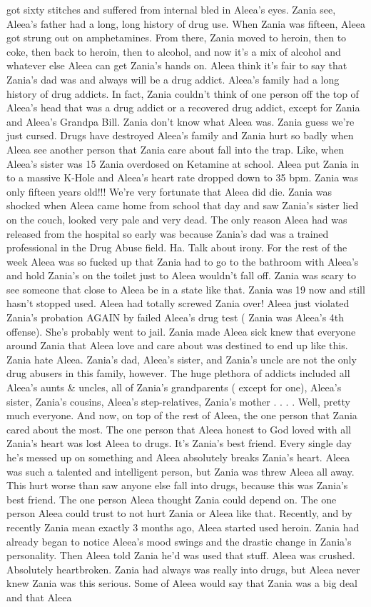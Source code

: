 \documentclass[12pt]{book}
\begin{document}
got sixty stitches and suffered from internal bled in Aleea's eyes. Zania see, Aleea's father had a long, long history of drug use. When Zania was fifteen, Aleea got strung out on amphetamines. From there, Zania moved to heroin, then to coke, then back to heroin, then to alcohol, and now it's a mix of alcohol and whatever else Aleea can get Zania's hands on. Aleea think it's fair to say that Zania's dad was and always will be a drug addict. Aleea's family had a long history of drug addicts. In fact, Zania couldn't think of one person off the top of Aleea's head that was a drug addict or a recovered drug addict, except for Zania and Aleea's Grandpa Bill. Zania don't know what Aleea was. Zania guess we're just cursed. Drugs have destroyed Aleea's family and Zania hurt so badly when Aleea see another person that Zania care about fall into the trap. Like, when Aleea's sister was 15 Zania overdosed on Ketamine at school. Aleea put Zania in to a massive K-Hole and Aleea's heart rate dropped down to 35 bpm. Zania was only fifteen years old!!! We're very fortunate that Aleea did die. Zania was shocked when Aleea came home from school that day and saw Zania's sister lied on the couch, looked very pale and very dead. The only reason Aleea had was released from the hospital so early was because Zania's dad was a trained professional in the Drug Abuse field. Ha. Talk about irony. For the rest of the week Aleea was so fucked up that Zania had to go to the bathroom with Aleea's and hold Zania's on the toilet just to Aleea wouldn't fall off. Zania was scary to see someone that close to Aleea be in a state like that. Zania was 19 now and still hasn't stopped used. Aleea had totally screwed Zania over! Aleea just violated Zania's probation AGAIN by failed Aleea's drug test ( Zania was Aleea's 4th offense). She's probably went to jail. Zania made Aleea sick knew that everyone around Zania that Aleea love and care about was destined to end up like this. Zania hate Aleea. Zania's dad, Aleea's sister, and Zania's uncle are not the only drug abusers in this family, however. The huge plethora of addicts included all Aleea's aunts \& uncles, all of Zania's grandparents ( except for one), Aleea's sister, Zania's cousins, Aleea's step-relatives, Zania's mother . . .  . Well, pretty much everyone. And now, on top of the rest of Aleea, the one person that Zania cared about the most. The one person that Aleea honest to God loved with all Zania's heart was lost Aleea to drugs. It's Zania's best friend. Every single day he's messed up on something and Aleea absolutely breaks Zania's heart. Aleea was such a talented and intelligent person, but Zania was threw Aleea all away. This hurt worse than saw anyone else fall into drugs, because this was Zania's best friend. The one person Aleea thought Zania could depend on. The one person Aleea could trust to not hurt Zania or Aleea like that. Recently, and by recently Zania mean exactly 3 months ago, Aleea started used heroin. Zania had already began to notice Aleea's mood swings and the drastic change in Zania's personality. Then Aleea told Zania he'd was used that stuff. Aleea was crushed. Absolutely heartbroken. Zania had always was really into drugs, but Aleea never knew Zania was this serious. Some of Aleea would say that Zania was a big deal and that Aleea 
\end{document}
